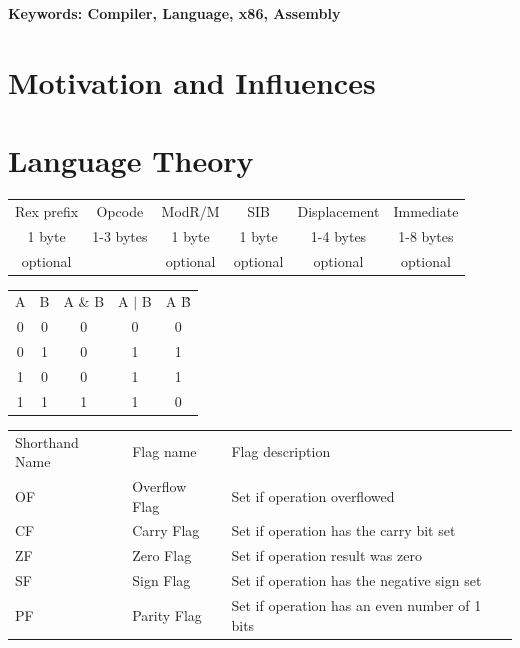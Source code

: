\documentclass[a4paper,oneside,onecolumn,12pt]{LegrandOrangeBook}
\begin{document}
\textbf{Keywords: Compiler, Language, x86, Assembly}

\chapter*{Motivation and Influences}

\chapter{Language Theory}
\begin{center}
    \begin{tabular}{|c|c|c|c|c|c|}
        Rex prefix & Opcode & ModR/M & SIB & Displacement & Immediate \\
        1 byte & 1-3 bytes & 1 byte & 1 byte & 1-4 bytes & 1-8 bytes \\
        optional &  & optional & optional & optional & optional
    \end{tabular}
\end{center}
\begin{center}
    \begin{tabular}{|c|c|c|c|c|}
        A & B & A \& B & A $|$ B & A \^ B \\
        0 & 0 & 0 & 0 & 0 \\
        0 & 1 & 0 & 1 & 1 \\
        1 & 0 & 0 & 1 & 1 \\
        1 & 1 & 1 & 1 & 0
    \end{tabular}
\end{center}
\begin{center}
    \begin{tabular}{|l|l|l|}
        Shorthand Name & Flag name & Flag description \\
        OF & Overflow Flag & Set if operation overflowed \\
        CF & Carry Flag & Set if operation has the carry bit set \\
        ZF & Zero Flag & Set if operation result was zero \\
        SF & Sign Flag & Set if operation has the negative sign set \\
        PF & Parity Flag & Set if operation has an even number of 1 bits \\
    \end{tabular}
\end{center}
\end{document}
